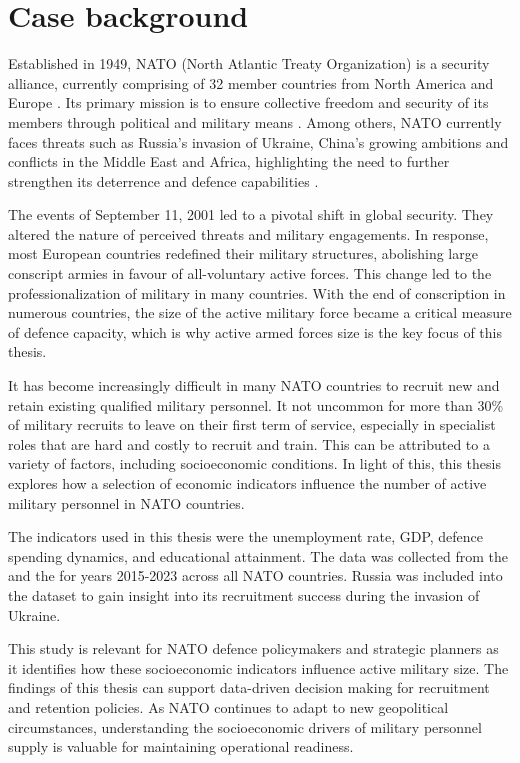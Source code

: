 \chapter{Case background}

Established in 1949, NATO (North Atlantic Treaty Organization) is a security
alliance, currently
comprising of 32 member countries from North America and Europe \parencite{nato_what_nodate, us_mission_to_nato_about_nodate}.
Its primary mission is to ensure collective freedom and security of its members through 
political and military means \parencite{us_mission_to_nato_about_nodate}. Among others, NATO currently faces 
threats such as  Russia's invasion of Ukraine, China's growing ambitions and conflicts 
in the Middle East and Africa, highlighting the need to further strengthen its deterrence 
and defence capabilities \parencite{nato_nato_2022}.

The events of September 11, 2001 led to a pivotal shift in global security. They altered the nature 
of perceived threats and military engagements. In response, most European countries redefined their 
military structures, abolishing large conscript armies in favour of all-voluntary active forces. 
This change led to the professionalization of military in many countries. \parencite{herranen_professional_2004}
With the end of conscription in numerous countries, the size of the active military force 
became a critical measure of defence capacity, which is why active armed forces size 
is the key focus of this thesis.

It has become increasingly difficult in many NATO countries to recruit new 
and retain existing qualified military personnel. 
It not uncommon for more than 30\% of military recruits to leave on their first term of service, 
especially in specialist roles that are hard and costly to recruit and train.
This can be attributed to 
a variety of factors, including socioeconomic conditions. \parencite{nato_research_and_technology_organization_recruiting_2007}
In light of this, this thesis explores how a selection of economic indicators 
influence the number of active military personnel in NATO countries.

The indicators used in this thesis were the unemployment rate, GDP, defence spending dynamics, 
and educational attainment. The data was collected from the \textcite{noauthor_world_bank_nodate} 
and the \textcite{noauthor_military_balance_nodate}
for years 2015-2023 across all NATO countries. Russia was included into the dataset to gain insight 
into its recruitment success during the invasion of Ukraine.

This study is relevant for NATO defence policymakers and strategic planners as it identifies how 
these socioeconomic indicators influence active military size. The findings of this thesis can 
support data-driven decision making for recruitment and retention policies. As NATO continues to 
adapt to new geopolitical circumstances, understanding the socioeconomic drivers of military 
personnel supply is valuable for maintaining operational readiness.
